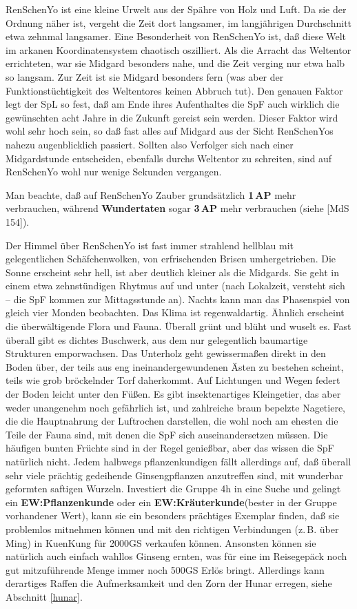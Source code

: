 \documentclass[
a4paper,
twoside,
DIV=calc,
BCOR=4mm,
fontsize=9pt,
twocolumn=on,
titlepage=on,
parskip=half
]{scrartcl}
\begin{document}
RenSchenYo ist eine kleine Urwelt aus der Spähre von Holz und Luft. Da
sie der Ordnung näher ist, vergeht die Zeit dort langsamer, im
langjährigen Durchschnitt etwa zehnmal langsamer. Eine Besonderheit
von RenSchenYo ist, daß diese Welt im arkanen Koordinatensystem
chaotisch oszilliert. Als die Arracht das Weltentor errichteten, war
sie Midgard besonders nahe, und die Zeit verging nur etwa halb so
langsam. Zur Zeit ist sie Midgard besonders fern (was aber der
Funktionstüchtigkeit des Weltentores keinen Abbruch tut). Den genauen
Faktor legt der SpL so fest, daß am Ende ihres Aufenthaltes die SpF
auch wirklich die gewünschten acht Jahre in die Zukunft gereist sein
werden. Dieser Faktor wird wohl sehr hoch sein, so daß fast alles auf
Midgard aus der Sicht RenSchenYos nahezu augenblicklich
passiert. Sollten also Verfolger sich nach einer Midgardstunde
entscheiden, ebenfalls durchs Weltentor zu schreiten, sind auf
RenSchenYo wohl nur wenige Sekunden vergangen.

Man beachte, daß auf RenSchenYo Zauber grundsätzlich \textbf{1\,AP}
mehr verbrauchen, während \textbf{Wundertaten} sogar \textbf{3\,AP}
mehr verbrauchen (siehe [MdS\,154]).

Der Himmel über RenSchenYo ist fast immer strahlend hellblau mit
gelegentlichen Schäfchenwolken, von erfrischenden Brisen
umhergetrieben. Die Sonne erscheint sehr hell, ist aber deutlich
kleiner als die Midgards. Sie geht in einem etwa zehnstündigen Rhytmus
auf und unter (nach Lokalzeit, versteht sich -- die SpF kommen zur
Mittagsstunde an). Nachts kann man das Phasenspiel von gleich vier
Monden beobachten. Das Klima ist regenwaldartig. Ähnlich erscheint die
überwältigende Flora und Fauna. Überall grünt und blüht und wuselt
es. Fast überall gibt es dichtes Buschwerk, aus dem nur gelegentlich
baumartige Strukturen emporwachsen. Das Unterholz geht gewissermaßen
direkt in den Boden über, der teils aus eng ineinandergewundenen Ästen
zu bestehen scheint, teils wie grob bröckelnder Torf daherkommt. Auf
Lichtungen und Wegen federt der Boden leicht unter den Füßen. Es gibt
insektenartiges Kleingetier, das aber weder unangenehm noch gefährlich
ist, und zahlreiche braun bepelzte Nagetiere, die die Hauptnahrung der
Luftrochen darstellen, die wohl noch am ehesten die Teile der Fauna
sind, mit denen die SpF sich auseinandersetzen müssen. Die häufigen
bunten Früchte sind in der Regel genießbar, aber das wissen die SpF
natürlich nicht. Jedem halbwegs pflanzenkundigen fällt allerdings auf,
daß überall sehr viele prächtig gedeihende Ginsengpflanzen anzutreffen
sind, mit wunderbar geformten saftigen Wurzeln. Investiert die Gruppe
4h in eine Suche und gelingt ein \textbf{EW:Pflanzenkunde} oder ein
\textbf{EW:Kräuterkunde}(bester in der Gruppe vorhandener Wert), kann
sie ein besonders prächtiges Exemplar finden, daß sie problemlos
mitnehmen können und mit den richtigen Verbindungen (z.\,B. über Ming)
in KuenKung für 2000GS verkaufen können. Ansonsten können sie
natürlich auch einfach wahllos Ginseng ernten, was für eine im
Reisegepäck noch gut mitzuführende Menge immer noch 500GS Erlös
bringt. Allerdings kann derartiges Raffen die Aufmerksamkeit und den
Zorn der Hunar erregen, siehe Abschnitt \ref{hunar}.
\end{document}
